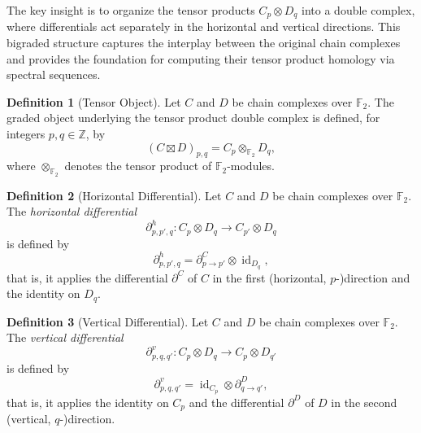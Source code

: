 \documentclass[11pt]{article}
\theoremstyle{plain}
\theoremstyle{definition}
\newtheorem*{definition}{Definition}
\theoremstyle{remark}
\begin{document}
The key insight is to organize the tensor products $C_p \otimes D_q$ into a double complex, where differentials act separately in the horizontal and vertical directions. This bigraded structure captures the interplay between the original chain complexes and provides the foundation for computing their tensor product homology via spectral sequences.

\begin{definition}[Tensor Object]
Let $C$ and $D$ be chain complexes over $\mathbb{F}_2$. The graded object underlying the tensor product double complex is defined, for integers $p, q \in \mathbb{Z}$, by
\[
(C \boxtimes D)_{p,q} = C_p \otimes_{\mathbb{F}_2} D_q,
\]
where $\otimes_{\mathbb{F}_2}$ denotes the tensor product of $\mathbb{F}_2$-modules.
\end{definition}

\begin{definition}[Horizontal Differential]
Let $C$ and $D$ be chain complexes over $\mathbb{F}_2$. The \emph{horizontal differential}
\[
\partial^h_{p,p',q} : C_p \otimes D_q \longrightarrow C_{p'} \otimes D_q
\]
is defined by
\[
\partial^h_{p,p',q} = \partial^C_{p \to p'} \otimes \operatorname{id}_{D_q},
\]
that is, it applies the differential $\partial^C$ of $C$ in the first (horizontal, $p$-)direction and the identity on $D_q$.
\end{definition}

\begin{definition}[Vertical Differential]
Let $C$ and $D$ be chain complexes over $\mathbb{F}_2$. The \emph{vertical differential}
\[
\partial^v_{p,q,q'} : C_p \otimes D_q \longrightarrow C_p \otimes D_{q'}
\]
is defined by
\[
\partial^v_{p,q,q'} = \operatorname{id}_{C_p} \otimes \partial^D_{q \to q'},
\]
that is, it applies the identity on $C_p$ and the differential $\partial^D$ of $D$ in the second (vertical, $q$-)direction.
\end{definition}
\end{document}
